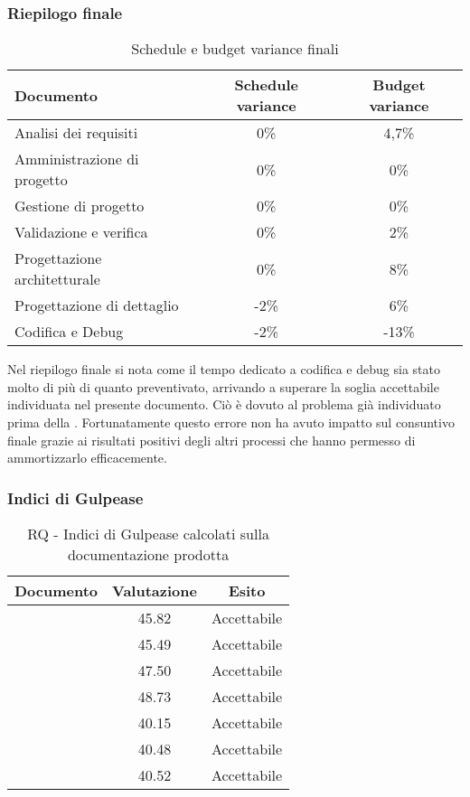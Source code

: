 \documentclass[../PianoDiQualifica.tex]{subfiles}
\begin{document}
						\subsubsection{Riepilogo finale}
						\begin{table}[H]
							\center
							\begin{tabular}{|l|c|c|}
								\hline
								\rowcolor{blue!30}\textbf{Documento} & \textbf{Schedule variance} & \textbf{Budget variance} \\ \hline
								Analisi dei requisiti & 0\% & 4,7\% \\ \hline
								Amministrazione di progetto & 0\% & 0\% \\ \hline
								Gestione di progetto & 0\% & 0\% \\ \hline
								Validazione e verifica & 0\% & 2\% \\ \hline
								Progettazione architetturale & 0\% & 8\% \\ \hline
								Progettazione di dettaglio & -2\% & 6\% \\ \hline
								Codifica e Debug & -2\% & -13\% \\ \hline
							\end{tabular}
							\caption{Schedule e budget variance finali}
						\end{table}
						Nel riepilogo finale si nota come il tempo dedicato a codifica e debug sia stato molto di più di quanto preventivato, arrivando a superare la soglia accettabile individuata nel presente documento. Ciò è dovuto al problema già individuato prima della \revisionediqualifica. Fortunatamente questo errore non ha avuto impatto sul consuntivo finale grazie ai risultati positivi degli altri processi che hanno permesso di ammortizzarlo efficacemente.

						\subsubsection{Indici di Gulpease}
						\begin{table}[H]
							\center
							\begin{tabular}{|l|c|c|}
								\hline
								\rowcolor{blue!30}\textbf{Documento} & \textbf{Valutazione} & \textbf{Esito} \\ \hline
								\analisideirequisitiRA & 45.82 & Accettabile \\ \hline
								\glossarioRA & 45.49 & Accettabile \\ \hline
								\normediprogettoRA & 47.50 & Accettabile \\ \hline
								\pianodiprogettoRA & 48.73 & Accettabile \\ \hline
								\pianodiqualificaRA & 40.15 & Accettabile \\ \hline
								\specificatecnicaRA & 40.48 & Accettabile \\ \hline
								 & 40.52 & Accettabile \\ \hline
							\end{tabular}
							\caption{RQ - Indici di Gulpease calcolati sulla documentazione prodotta}
						\end{table}
\end{document}
